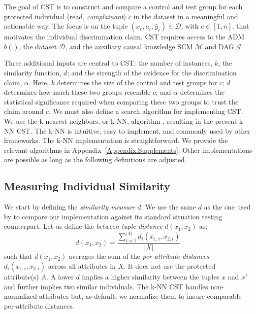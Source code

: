 %
The goal of CST is to construct and compare a control and test group for each protected individual (read, \textit{complainant}) $c$ in the dataset in a meaningful and actionable way. 
The focus is on the tuple $(x_c, a_c, \widehat{y}_c) \in \mathcal{D}$, with $c \in [1,n]$, that motivates the individual discrimination claim.
CST requires access to the ADM $b()$, the dataset $\mathcal{D}$, and the auxiliary causal knowledge SCM $\mathcal{M}$ and DAG $\mathcal{G}$.

Three additional inputs are central to CST:
the number of instances, $k$; 
the similarity function, $d$; 
and the strength of the evidence for the discrimination claim, $\alpha$.
Here, 
$k$ determines the size of the control and test groups for $c$; 
$d$ determines how much these two groups resemble $c$; 
and $\alpha$ determines the statistical significance required when comparing these two groups to trust the claim around $c$.
%
We must also define a search algorithm for implementing CST.
We use the k-nearest neighbors, or k-NN, algorithm \parencite{Hastie2009_ElementsSL}, resulting in the present k-NN CST.
The k-NN is intuitive, easy to implement, and commonly used by other frameworks.
The k-NN implementation is straightforward. 
We provide the relevant algorithms in Appendix~\ref{Appendix.Supplements}.
Other implementations are possible as long as the following definitions are adjusted.

\subsection{Measuring Individual Similarity}
\label{sec:CST.Distance}

We start by defining the \textit{similarity measure} $d$.
We use the same $d$ as the one used by \textcite{Thanh_KnnSituationTesting2011} to compare our implementation against its standard situation testing counterpart.
%
Let us define the \textit{between tuple distance} $d(x_1, x_2)$ as:
%
\begin{equation}
\label{eq:Distance}
    d(x_1, x_2) = \frac{\sum_{i=1}^{|X|} d_i(x_{1, i}, x_{2, i})}{|X|}
\end{equation}
%
such that $d(x_1, x_2)$ averages the sum of the \textit{per-attribute distances} $d_i(x_{1,i}, x_{2, i})$ across all attributes in $X$. 
It does not use the protected attribute(s) $A$.
A lower $d$ implies a higher similarity between the tuples $x$ and $x'$ and further implies two similar individuals.
The k-NN CST handles non-normalized attributes but, as default, we normalize them to insure comparable per-attribute distances.

